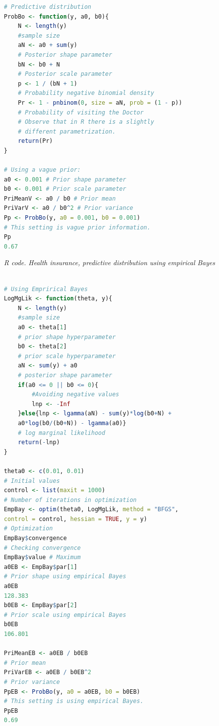 \begin{enumerate}[leftmargin=*]
\begin{tcolorbox}[enhanced,width=4.67in,center upper,
	fontupper=\large\bfseries,drop shadow southwest,sharp corners]
\begin{VF}
\begin{lstlisting}[basicstyle=\footnotesize, language=R]
# Predictive distribution
ProbBo <- function(y, a0, b0){
	N <- length(y) 
	#sample size
	aN <- a0 + sum(y) 
	# Posterior shape parameter
	bN <- b0 + N 
	# Posterior scale parameter
	p <- 1 / (bN + 1) 
	# Probability negative binomial density
	Pr <- 1 - pnbinom(0, size = aN, prob = (1 - p)) 
	# Probability of visiting the Doctor
	# Observe that in R there is a slightly 
	# different parametrization.
	return(Pr)
} 

# Using a vague prior:
a0 <- 0.001 # Prior shape parameter
b0 <- 0.001 # Prior scale parameter
PriMeanV <- a0 / b0 # Prior mean
PriVarV <- a0 / b0^2 # Prior variance
Pp <- ProbBo(y, a0 = 0.001, b0 = 0.001) 
# This setting is vague prior information.
Pp
0.67
\end{lstlisting}
\end{VF}
\end{tcolorbox}


\begin{tcolorbox}[enhanced,width=4.67in,center upper,
	fontupper=\large\bfseries,drop shadow southwest,sharp corners]
	\textit{R code. Health insurance, predictive distribution using empirical Bayes}
\begin{VF}
\begin{lstlisting}[basicstyle=\footnotesize, language=R]
	
# Using Emprirical Bayes
LogMgLik <- function(theta, y){
	N <- length(y) 
	#sample size
	a0 <- theta[1] 
	# prior shape hyperparameter
	b0 <- theta[2] 
	# prior scale hyperparameter
	aN <- sum(y) + a0 
	# posterior shape parameter
	if(a0 <= 0 || b0 <= 0){ 
		#Avoiding negative values
		lnp <- -Inf
	}else{lnp <- lgamma(aN) - sum(y)*log(b0+N) + 
	a0*log(b0/(b0+N)) - lgamma(a0)} 
    # log marginal likelihood
	return(-lnp)
}

theta0 <- c(0.01, 0.01) 
# Initial values
control <- list(maxit = 1000) 
# Number of iterations in optimization
EmpBay <- optim(theta0, LogMgLik, method = "BFGS", 
control = control, hessian = TRUE, y = y) 
# Optimization
EmpBay$convergence 
# Checking convergence
EmpBay$value # Maximum
a0EB <- EmpBay$par[1] 
# Prior shape using empirical Bayes
a0EB
128.383
b0EB <- EmpBay$par[2] 
# Prior scale using empirical Bayes
b0EB 
106.801

PriMeanEB <- a0EB / b0EB 
# Prior mean
PriVarEB <- a0EB / b0EB^2 
# Prior variance
PpEB <- ProbBo(y, a0 = a0EB, b0 = b0EB) 
# This setting is using empirical Bayes.
PpEB
0.69
\end{lstlisting}
\end{VF}
\end{tcolorbox}


\end{enumerate}
